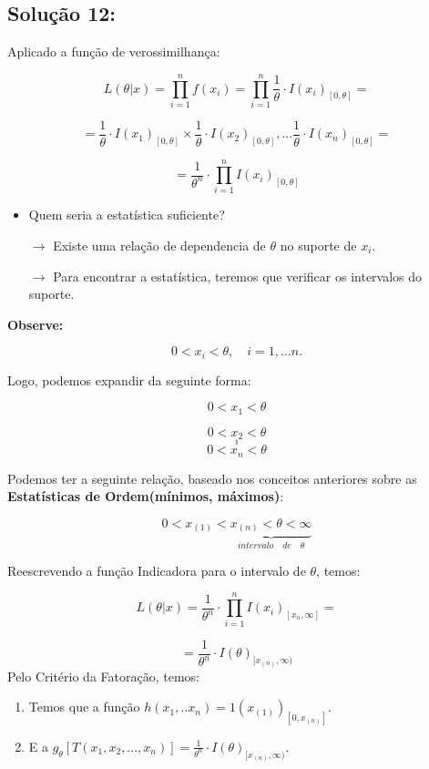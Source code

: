 \documentclass[
]{report}
\providecommand{\tightlist}{%
  \setlength{\itemsep}{0pt}\setlength{\parskip}{0pt}}\usepackage{longtable,booktabs,array}
\begin{document}
\subsection{Solução 12:}\label{soluuxe7uxe3o-12}

Aplicado a função de verossimilhança:

\[
L(\theta|x) = \prod_{i=1}^{n} f(x_i) = \prod_{i=1}^{n} \frac{1}{\theta} \cdot I(x_i)_{[0,\theta]}= 
\]

\[
=  \frac{1}{\theta} \cdot I(x_1)_{[0,\theta]} \times \frac{1}{\theta} \cdot I(x_2)_{[0,\theta]},...\frac{1}{\theta} \cdot I(x_n)_{[0,\theta]} =
\]

\[
= \frac{1}{\theta^{n}} \cdot \prod_{i=1}^{n} I(x_i)_{[0,\theta]}
\]

\begin{itemize}
\item
  Quem seria a estatística suficiente?

  \(\rightarrow\) Existe uma relação de dependencia de \(\theta\) no
  suporte de \(x_i\).

  \(\rightarrow\) Para encontrar a estatística, teremos que verificar os
  intervalos do suporte.
\end{itemize}

\textbf{Observe:}

\[
0 < x_i < \theta, \quad i=1,...n.
\]

Logo, podemos expandir da seguinte forma:

\[
0 < x_1 < \theta
\]

\[
0 < x_2 < \theta
\] \[
.
\] \[
.
\] \[
.
\] \[
0 < x_n < \theta
\]

Podemos ter a seguinte relação, baseado nos conceitos anteriores sobre
as \textbf{Estatísticas de Ordem(mínimos, máximos)}:

\[
0 <x_{(1)} < \underbrace{x_{(n)}<\theta<\infty}_{intervalo \quad de \quad  \theta}
\]

Reescrevendo a função Indicadora para o intervalo de \(\theta\), temos:

\[
L(\theta|x) = \frac{1}{\theta^{n}} \cdot \prod_{i=1}^{n} I(x_i)_{[x_{n},\infty]} =
\]

\[
= \frac{1}{\theta^{n}} \cdot I(\theta)_{[x_{(n)}, \infty)}
\] Pelo Critério da Fatoração, temos:

\begin{enumerate}
\def\labelenumi{\arabic{enumi}.}
\tightlist
\item
  Temos que a função \(h(x_1,..x_n) = 1(x_{(1)})_{[0,x_{(n)}]}\).
\item
  E a
  \(g_\theta[T(x_1,x_2,...,x_n)]= \frac{1}{\theta^{n}} \cdot I(\theta)_{[x_{(n)}, \infty)}\).
\end{enumerate}
\end{document}
